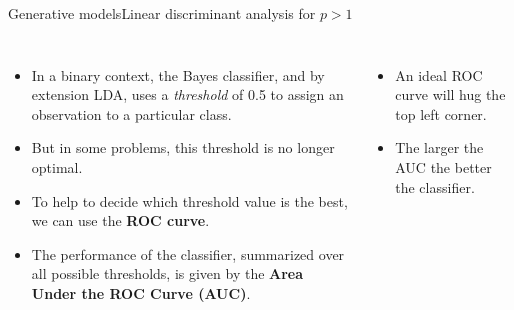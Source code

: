 \begin{frame}{Generative models}{Linear discriminant analysis for $p > 1$}

\begin{columns}
    \footnotesize

    \begin{itemize}
    \item In a binary context, the Bayes classifier, and by extension LDA, uses a \textit{threshold} of 0.5 to assign an observation to a particular class. \pause

    \item But in some problems, this threshold is no longer optimal. \pause

    \item To help to decide which threshold value is the best, we can use the \textbf{ROC curve}. \pause

    \item The performance of the classifier, summarized over all possible thresholds, is given by the \textbf{Area Under the ROC Curve (AUC)}. \pause
    
\end{itemize}
    

    \begin{itemize} \footnotesize
        \item An ideal ROC curve will hug the top left corner. \pause
        \item The larger the AUC the better the classifier.
    \end{itemize}

\end{columns}


\end{frame}

